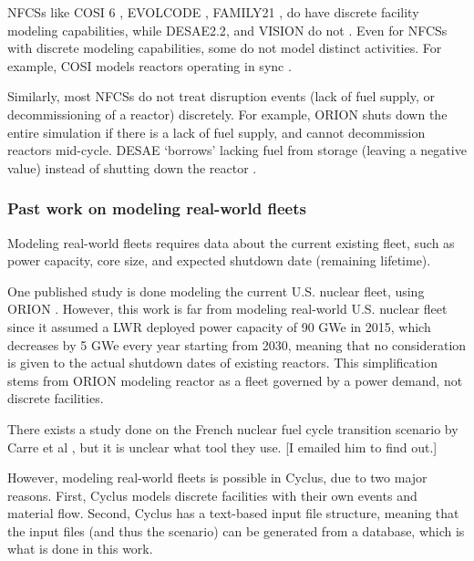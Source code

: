\glspl{NFCS} like COSI 6 \cite{meyer_new_2009}, EVOLCODE \cite{alvarez-velarde_validation_2014},
FAMILY21 \cite{oecd_nuclear_2009},
do have discrete facility modeling capabilities, while
DESAE2.2\cite{tsibulskiy_desae_2006}, and VISION \cite{jacobson_verifiable_2010} do
not \cite{boucher_international_2010}. Even for \glspl{NFCS} with discrete modeling
capabilities, some do not model distinct activities. For example, COSI models
reactors operating in sync \cite{boucher_benchmark_2012}.

Similarly, most \glspl{NFCS} do not treat disruption events (lack of fuel supply,
or decommissioning of a reactor)
discretely. For example, ORION shuts down the entire simulation if there
is a lack of fuel supply, and cannot decommission reactors mid-cycle.
DESAE `borrows' lacking fuel from storage (leaving a
negative value) instead of shutting down the reactor \cite{mccarthy_benchmark_2012}.

\subsubsection{Past work on modeling real-world fleets}
Modeling real-world fleets requires data about the current existing fleet,
such as power capacity, core size, and expected shutdown date (remaining lifetime).

One published study is done modeling the current U.S. nuclear fleet,
using ORION \cite{sunny_transition_2015}. However, this work is far from
modeling real-world U.S. nuclear fleet since it assumed a \gls{LWR} deployed power capacity
of 90 GWe in 2015, which decreases by 5 GWe every year starting from 2030,
meaning that no consideration is given to the actual shutdown dates of
existing reactors. This simplification stems from ORION modeling reactor as
a fleet governed by a power demand, not discrete facilities.

There exists a study done on the French nuclear fuel cycle transition scenario
by Carre et al \cite{carre_overview_2009}, but it is unclear what tool they use.
[I emailed him to find out.]

However, modeling real-world fleets is possible in Cyclus, due to two major
reasons. First, Cyclus models
discrete facilities with their own events and material flow.
Second, Cyclus has a text-based input file structure, meaning that
the input files (and thus the scenario) can be generated from 
a database, which is what is done in this work.

